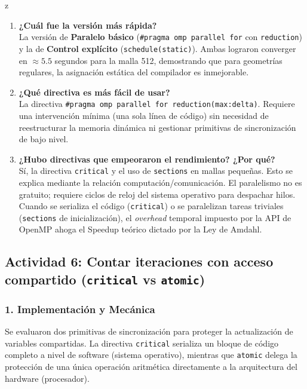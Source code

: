 z\documentclass[11pt,a4paper]{article}
\begin{document}
\begin{enumerate}
    \item \textbf{¿Cuál fue la versión más rápida?} \\
    La versión de \textbf{Paralelo básico} (\texttt{\#pragma omp parallel for} con \texttt{reduction}) y la de \textbf{Control explícito} (\texttt{schedule(static)}). Ambas lograron converger en $\approx \mathbf{5.5}$ segundos para la malla 512, demostrando que para geometrías regulares, la asignación estática del compilador es inmejorable.

    \item \textbf{¿Qué directiva es más fácil de usar?} \\
    La directiva \texttt{\#pragma omp parallel for reduction(max:delta)}. Requiere una intervención mínima (una sola línea de código) sin necesidad de reestructurar la memoria dinámica ni gestionar primitivas de sincronización de bajo nivel.

    \item \textbf{¿Hubo directivas que empeoraron el rendimiento? ¿Por qué?} \\
    Sí, la directiva \texttt{critical} y el uso de \texttt{sections} en mallas pequeñas. Esto se explica mediante la relación computación/comunicación. El paralelismo no es gratuito; requiere ciclos de reloj del sistema operativo para despachar hilos. Cuando se serializa el código (\texttt{critical}) o se paralelizan tareas triviales (\texttt{sections} de inicialización), el \textit{overhead} temporal impuesto por la API de OpenMP ahoga el Speedup teórico dictado por la Ley de Amdahl.
\end{enumerate}


\subsection*{Actividad 6: Contar iteraciones con acceso compartido (\texttt{critical} vs \texttt{atomic})}

\subsubsection*{1. Implementación y Mecánica}
Se evaluaron dos primitivas de sincronización para proteger la actualización de variables compartidas. La directiva \texttt{critical} serializa un bloque de código completo a nivel de software (sistema operativo), mientras que \texttt{atomic} delega la protección de una única operación aritmética directamente a la arquitectura del hardware (procesador).
\end{document}
